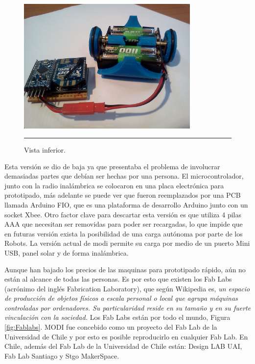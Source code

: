 \begin{figure}[htbp]
	\centering
		\includegraphics[width=0.8\textwidth]{./Pictures/3MODIrev2.jpg}
		\rule{35em}{0.5pt}
	\caption[modirev1]{Vista inferior.}
	\label{fig:3modirev2}
\end{figure}

Esta versión se dio de baja ya que presentaba el problema de involucrar demasiadas partes que debían ser hechas por una persona. El microcontrolador, junto con la radio inalámbrica se colocaron en una placa electrónica para prototipado, más adelante se puede ver que fueron reemplazados por una PCB llamada Arduino FIO, que es una plataforma de desarrollo Arduino junto con un socket Xbee. Otro factor clave para descartar esta versión es que utiliza 4 pilas AAA que necesitan ser removidas para poder ser recargadas, lo que impide que en futuras versión exista la posibilidad de una carga autónoma por parte de los Robots. La versión actual de modi permite su carga por medio de un puerto Mini USB, panel solar y de forma inalámbrica.

Aunque han bajado los precios de las maquinas para prototipado rápido, aún no están al alcance de todas las personas. Es por esto que existen los Fab Labs (acrónimo del inglés Fabrication Laboratory), que según Wikipedia es, \textit{un espacio de producción de objetos físicos a escala personal o local que agrupa máquinas controladas por ordenadores. Su particularidad reside en su tamaño y en su fuerte vinculación con la sociedad.} Los Fab Labs están por todo el mundo, Figura \ref{fig:Fablabs}. MODI fue concebido como un proyecto del Fab Lab de la Universidad de Chile y por esto es posible reproducirlo en cualquier Fab Lab. En Chile, además del Fab Lab de la Universidad de Chile están: Design LAB UAI, Fab Lab Santiago y Stgo MakerSpace. 

